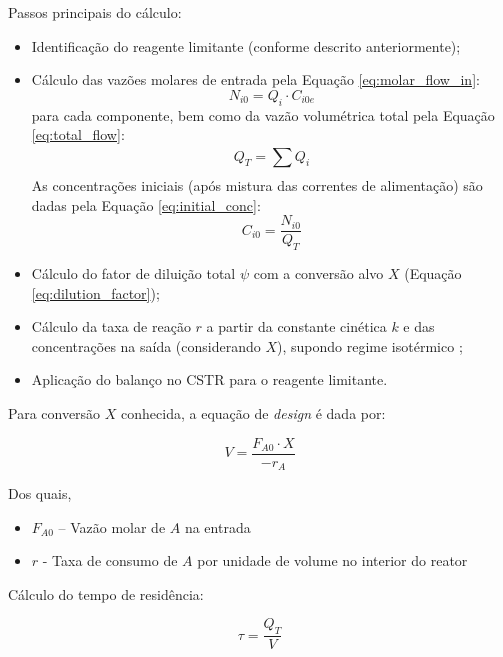 Passos principais do cálculo:
\begin{itemize}
    \item Identificação do reagente limitante (conforme descrito anteriormente);
    \item Cálculo das vazões molares de entrada pela Equação \ref{eq:molar_flow_in}:
    \begin{equation}
    N_{i 0} = Q_{i} \cdot C_{i 0 e}
    \label{eq:molar_flow_in}
    \end{equation}
    para cada componente, bem como da vazão volumétrica total pela Equação \ref{eq:total_flow}:
    \begin{equation}
    Q_{T} = \sum_{}^{} Q_{i}
    \label{eq:total_flow}
    \end{equation}
    As concentrações iniciais (após mistura das correntes de alimentação) são dadas pela Equação \ref{eq:initial_conc}:
    \begin{equation}
    C_{i 0} = \frac{N_{i 0}}{Q_{T}}
    \label{eq:initial_conc}
    \end{equation}
    \item Cálculo do fator de diluição total $\psi$ com a conversão alvo $X$ (Equação \ref{eq:dilution_factor});
    \item Cálculo da taxa de reação $r$ a partir da constante cinética $k$ e das concentrações na saída (considerando $X$), supondo regime isotérmico \cite{fogler2009};
    \item Aplicação do balanço no CSTR para o reagente limitante.
\end{itemize}

Para conversão $X$ conhecida, a equação de \textit{design} é dada por:

\begin{equation}
V = \frac{F_{A 0} \cdot X}{- r_{A}}
\label{eq:cstr_design}
\end{equation}

Dos quais,
\begin{itemize}
    \item $F_{A 0}$ – Vazão molar de $A$ na entrada
    \item $r$ - Taxa de consumo de $A$ por unidade de volume no interior do reator
\end{itemize}

Cálculo do tempo de residência:

\begin{equation}
\tau = \frac{Q_{T}}{V}
\label{eq:residence_time}
\end{equation}

